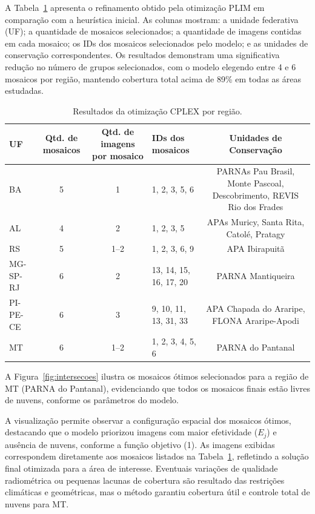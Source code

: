\documentclass[a4paper,11pt]{article}
\begin{document}
A Tabela~\ref{tab:resultados_cplex} apresenta o refinamento obtido pela otimização PLIM em comparação com a heurística inicial. As colunas mostram: a unidade federativa (UF); a quantidade de mosaicos selecionados; a quantidade de imagens contidas em cada mosaico; os IDs dos mosaicos selecionados pelo modelo; e as unidades de conservação correspondentes. Os resultados demonstram uma significativa redução no número de grupos selecionados, com o modelo elegendo entre 4 e 6 mosaicos por região, mantendo cobertura total acima de 89\% em todas as áreas estudadas.
\vspace{-5mm}
\begin{table}[htbp]
    \centering
    \caption{Resultados da otimização CPLEX por região.}
    \label{tab:resultados_cplex}
    \begin{adjustbox}{width=\textwidth}
    \begin{tabular}{@{}lccp{3.6cm}c@{}}
    \toprule
    \textbf{UF} & \textbf{Qtd. de mosaicos} & \textbf{Qtd. de imagens por mosaico} & \textbf{IDs dos mosaicos} & \textbf{Unidades de Conservação} \\
    \midrule
    BA      & 5 & 1 & 1, 2, 3, 5, 6 & PARNAs Pau Brasil, Monte Pascoal, Descobrimento, REVIS Rio dos Frades \\
    AL      & 4 & 2 & 1, 2, 3, 5 & APAs Muricy, Santa Rita, Catolé, Pratagy \\
    RS      & 5 & 1--2 & 1, 2, 3, 6, 9 & APA Ibirapuitã \\
    MG-SP-RJ& 6 & 2 & 13, 14, 15, 16, 17, 20 & PARNA Mantiqueira \\
    PI-PE-CE& 6 & 3 & 9, 10, 11, 13, 31, 33 & APA Chapada do Araripe, FLONA Araripe-Apodi \\
    MT      & 6 & 1--2 & 1, 2, 3, 4, 5, 6 & PARNA do Pantanal \\
    \bottomrule
    \end{tabular}
    \end{adjustbox}
\end{table}
\vspace{-4mm}

A Figura~\ref{fig:intersecoes} ilustra os mosaicos ótimos selecionados para a região de MT (PARNA do Pantanal), evidenciando que todos os mosaicos finais estão livres de nuvens, conforme os parâmetros do modelo.

A visualização permite observar a configuração espacial dos mosaicos ótimos, destacando que o modelo priorizou imagens com maior efetividade ($E_j$) e ausência de nuvens, conforme a função objetivo (1). As imagens exibidas correspondem diretamente aos mosaicos listados na Tabela~\ref{tab:resultados_cplex}, refletindo a solução final otimizada para a área de interesse. Eventuais variações de qualidade radiométrica ou pequenas lacunas de cobertura são resultado das restrições climáticas e geométricas, mas o método garantiu cobertura útil e controle total de nuvens para MT.
\end{document}
